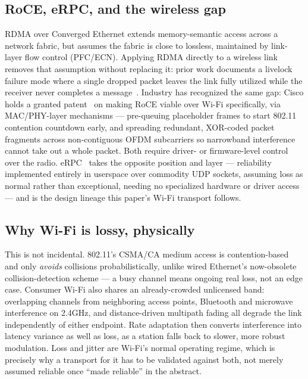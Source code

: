 \documentclass[11pt]{article}
\begin{document}
\subsection{RoCE, eRPC, and the wireless gap}
\label{sec:roce-gap}
RDMA over Converged Ethernet extends memory-semantic access across a network fabric, but assumes the fabric is close to lossless, maintained by link-layer flow control (PFC/ECN). Applying RDMA directly to a wireless link removes that assumption without replacing it: prior work documents a livelock failure mode where a single dropped packet leaves the link fully utilized while the receiver never completes a message~\cite{wrdma}. Industry has recognized the same gap: Cisco holds a granted patent~\cite{ciscoroce} on making RoCE viable over Wi-Fi specifically, via MAC/PHY-layer mechanisms --- pre-queuing placeholder frames to start 802.11 contention countdown early, and spreading redundant, XOR-coded packet fragments across non-contiguous OFDM subcarriers so narrowband interference cannot take out a whole packet. Both require driver- or firmware-level control over the radio. eRPC~\cite{erpc} takes the opposite position and layer --- reliability implemented entirely in userspace over commodity UDP sockets, assuming loss as normal rather than exceptional, needing no specialized hardware or driver access --- and is the design lineage this paper's Wi-Fi transport follows.

\subsection{Why Wi-Fi is lossy, physically}
This is not incidental. 802.11's CSMA/CA medium access is contention-based and only \emph{avoids} collisions probabilistically, unlike wired Ethernet's now-obsolete collision-detection scheme --- a busy channel means ongoing real loss, not an edge case. Consumer Wi-Fi also shares an already-crowded unlicensed band: overlapping channels from neighboring access points, Bluetooth and microwave interference on 2.4GHz, and distance-driven multipath fading all degrade the link independently of either endpoint. Rate adaptation then converts interference into latency variance as well as loss, as a station falls back to slower, more robust modulation. Loss and jitter are Wi-Fi's normal operating regime, which is precisely why a transport for it has to be validated against both, not merely assumed reliable once ``made reliable'' in the abstract.

\end{document}
